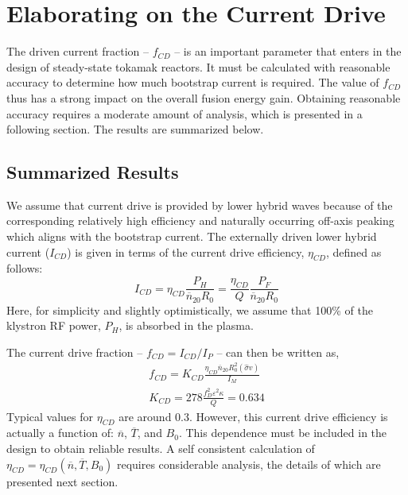 \chapter{Elaborating on the Current Drive}

\label{chapter:lhcd}

The driven current fraction -- $f_{CD}$ -- is an important parameter that enters in the design of steady-state tokamak reactors. It must be calculated with reasonable accuracy to determine how much bootstrap current is required. The value of $f_{CD}$ thus has a strong impact on the overall fusion energy gain. Obtaining reasonable accuracy requires a moderate amount of analysis, which is presented in a following section. The results are summarized below.

\section{Summarized Results}

We assume that current drive is provided by lower hybrid waves because of the corresponding relatively high efficiency and naturally occurring off-axis peaking which aligns with the bootstrap current. The externally driven lower hybrid current ($I_{CD}$) is given in terms of the current drive efficiency, $\eta_{CD}$, defined as follows:\cite{itercd}
\begin{equation}
	I _ { C D } = \eta _ { C D } \frac { P _ { H } } { \overline { n } _ { 20 } R _ { 0 } } = \frac { \eta _ { C D } } { Q } \frac { P _ { F } } { \overline { n } _ { 20 } R _ { 0 } }
\end{equation}
Here, for simplicity and slightly optimistically, we assume that 100\% of the klystron RF power, $P_H$, is absorbed in the plasma.

The current drive fraction -- $f_{CD} = I_{CD}/I_P$ -- can then be written as,
\begin{equation}
	\begin{array} { c } { f _ { C D } = K _ { C D } \frac { \eta _ { C D } \overline { n } _ { 20 } R _ { 0 } ^ { 2 } ( \hat { \sigma } v ) } { I _ { M } } } \\ { K _ { C D } = 278 \frac { f _ { D } ^ { 2 } \varepsilon ^ { 2 } \kappa } { Q } = 0.634 } \end{array}
\end{equation}
Typical values for $\eta_{CD}$ are around 0.3.\cite{itercd} However, this current drive efficiency is actually a function of: $\overline n$, $\overline T$, and $B_0$. This dependence must be included in the design to obtain reliable results. A self consistent calculation of $\eta_{CD} = \eta_{CD}(\overline n, \overline T, B_0)$ requires considerable analysis, the details of which are presented next section.

